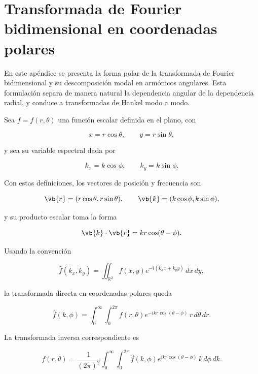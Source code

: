 \chapter{Transformada de Fourier bidimensional en coordenadas polares}
\label{sec:fourier_2d_polar}

En este apéndice se presenta la forma polar de la transformada de Fourier bidimensional y su descomposición modal en armónicos angulares. Esta formulación separa de manera natural la dependencia angular de la dependencia radial, y conduce a transformadas de Hankel modo a modo.


Sea $f=f(r,\theta)$ una función escalar definida en el plano, con

\begin{equation}
  x=r\cos\theta, \qquad y=r\sin\theta,
\end{equation}

y sea su variable espectral dada por

\begin{equation}
  k_x=k\cos\phi, \qquad k_y=k\sin\phi.
\end{equation}

Con estas definiciones, los vectores de posición y frecuencia son

\begin{equation}
  \vb{r}=(r\cos\theta,r\sin\theta), \qquad \vb{k}=(k\cos\phi,k\sin\phi),
\end{equation}

y su producto escalar toma la forma

\begin{equation}
  \vb{k}\cdot\vb{r}=kr\cos(\theta-\phi).
\end{equation}

Usando la convención

\begin{equation}
  \hat f(k_x,k_y)=\iint_{\mathbb{R}^2} f(x,y)e^{-i(k_xx+k_yy)}\,dx\,dy,
\end{equation}

la transformada directa en coordenadas polares queda

\begin{equation}
  \hat f(k,\phi)=
  \int_0^\infty \int_0^{2\pi}
  f(r,\theta)e^{-ikr\cos(\theta-\phi)}\,r\,d\theta\,dr.
  \label{eq:fourier_2d_polar_directa}
\end{equation}

La transformada inversa correspondiente es

\begin{equation}
  f(r,\theta)=
  \frac{1}{(2\pi)^2}
  \int_0^\infty \int_0^{2\pi}
  \hat f(k,\phi)e^{ikr\cos(\theta-\phi)}\,k\,d\phi\,dk.
  \label{eq:fourier_2d_polar_inversa}
\end{equation}

